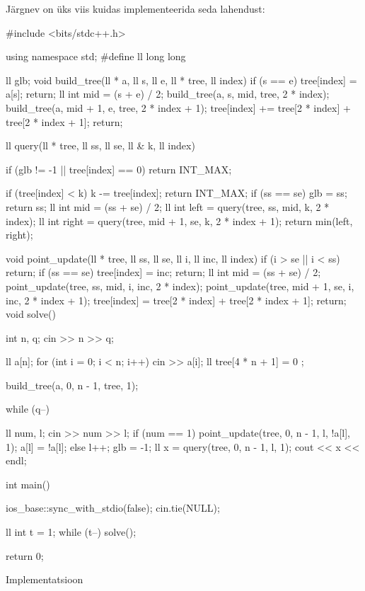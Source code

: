 \documentclass{trkut}
\theoremstyle{definition}
\begin{document}
Järgnev on üks viis kuidas implementeerida seda lahendust:
\begin{cclol}
#include <bits/stdc++.h>

using namespace std;
#define ll long long

ll glb;
void build_tree(ll * a, ll  s, ll e, ll * tree, ll  index) {
  if (s == e) {
    tree[index] = a[s];
    return;
  }
  ll int mid = (s + e) / 2;
  build_tree(a, s, mid, tree, 2 * index);
  build_tree(a, mid + 1, e, tree, 2 * index + 1);
  tree[index] += tree[2 * index] + tree[2 * index + 1];
  return;
}

ll query(ll * tree, ll ss, ll se, ll & k, ll index) {
  if (glb != -1 || tree[index] == 0)
    return INT_MAX;

  if (tree[index] < k) {
    k -= tree[index];
    return INT_MAX;
  }
  if (ss == se) {
    glb = ss;
    return ss;
  }
  ll int mid = (ss + se) / 2;
  ll int left = query(tree, ss, mid, k, 2 * index);
  ll int right = query(tree, mid + 1, se, k, 2 * index + 1);
  return min(left, right);
}
void point_update(ll * tree, ll ss, ll se, ll i, ll inc, ll index) {
  if (i > se || i < ss)
    return;
  if (ss == se) {
    tree[index] = inc;
    return;
  }
  ll int mid = (ss + se) / 2;
  point_update(tree, ss, mid, i, inc, 2 * index);
  point_update(tree, mid + 1, se, i, inc, 2 * index + 1);
  tree[index] = tree[2 * index] + tree[2 * index + 1];
  return;
}
void solve() {
  int n, q;
  cin >> n >> q;

  ll a[n];
  for (int i = 0; i < n; i++)
    cin >> a[i];
  ll tree[4 * n + 1] = {
    0
  };

  build_tree(a, 0, n - 1, tree, 1);

  while (q--) {
    ll num, l;
    cin >> num >> l;
    if (num == 1) {
      point_update(tree, 0, n - 1, l, !a[l], 1);
      a[l] = !a[l];
    } else {
      l++;
      glb = -1;
      ll x = query(tree, 0, n - 1, l, 1);
      cout << x << endl;
    }

  }

}
int main() {
  ios_base::sync_with_stdio(false);
  cin.tie(NULL);

  ll int t = 1;
  while (t--) {
    solve();
  }

  return 0;
}
\end{cclol}
\begin{kk}[H]%
    \caption{Implementatsioon}%
    \label{EMaxx}%
    \end{kk}
\end{document}
